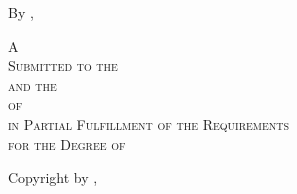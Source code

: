 \null %
\begin{center}
  \vfill
  {\Large{\MakeUppercase{\thesisTitle}}}

  \vfill

  By \MakeUppercase{\thesisAuthorName}, \thesisAuthorCredentials{}

  \vfill

  \textsc{
  A \thesisType{}\\
  Submitted to the \thesisInstitutionDepartment{}\\
  and the \thesisInstitutionGraduateStudies{}\\
  of \thesisInstitution{}\\
  in Partial Fulfillment of the Requirements\\
  for the Degree of\\
  \thesisTargetDegreeName{}}  
  
  \vfill

  \thesisInstitution{} \textcopyright{} Copyright by \thesisAuthorName{}, \thesisSubmissionMonthYear{}

\end{center}
